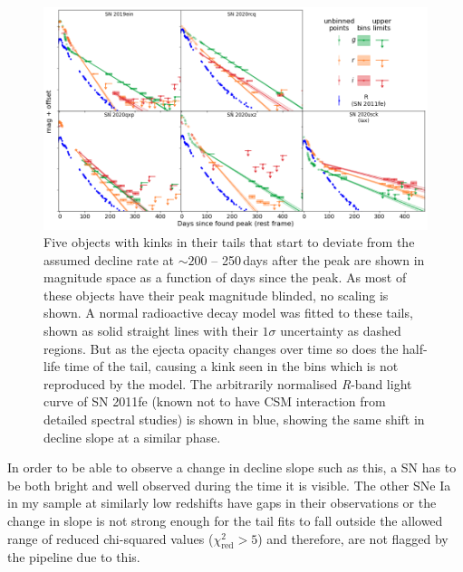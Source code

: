 \documentclass[a4paper,oneside,12pt, class=Latex/Classes/PhDthesisPSnPDF, crop=false]{standalone}
\begin{document}
\begin{figure}[h!]
 \centering
 \includegraphics[width=\textwidth]{../Images/chapter_3/kinktails_plots.png}
 \caption[Recovered SNe Ia with kinks in their tails.]{Five objects with kinks in their tails that start to deviate from the assumed decline rate at $\sim200$ -- 250\,days after the peak are shown in magnitude space as a function of days since the peak. As most of these objects have their peak magnitude blinded, no scaling is shown. A normal radioactive decay model was fitted to these tails, shown as solid straight lines with their $1\sigma$ uncertainty as dashed regions. But as the ejecta opacity changes over time so does the half-life time of the tail, causing a kink seen in the bins which is not reproduced by the model. The arbitrarily normalised \textit{R}-band light curve of SN 2011fe (known not to have CSM interaction from detailed spectral studies) \citep{spec_Lijiang-2.4m} is shown in blue, showing the same shift in decline slope at a similar phase.}
 \label{kink_plots}
\end{figure}

In order to be able to observe a change in decline slope such as this, a SN has to be both bright and well observed during the time it is visible. The other SNe Ia in my sample at similarly low redshifts have gaps in their observations or the change in slope is not strong enough for the tail fits to fall outside the allowed range of reduced chi-squared values ($\chi^2_\text{red} > 5$) and therefore, are not flagged by the pipeline due to this.
\end{document}
